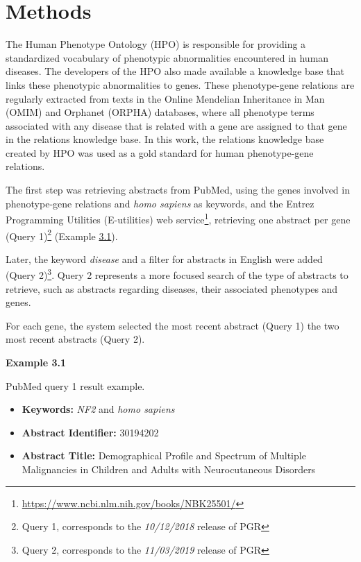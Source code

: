 
\section{Methods}

The Human Phenotype Ontology (HPO) \citep{HPO} is responsible for providing a standardized vocabulary of phenotypic abnormalities encountered in human diseases. The developers of the HPO also made available a knowledge base that links these phenotypic abnormalities to genes. These phenotype-gene relations are regularly extracted from texts in the Online Mendelian Inheritance in Man (OMIM) and  Orphanet (ORPHA) databases, where all phenotype terms associated with any disease that is related with a gene are assigned to that gene in the relations knowledge base. In this work, the relations knowledge base created by HPO was used as a gold standard for human phenotype-gene relations.

The first step was retrieving abstracts from PubMed, using the genes involved in phenotype-gene relations and \textit{homo sapiens} as keywords, and the Entrez Programming Utilities (E-utilities) web service\footnote{\url{https://www.ncbi.nlm.nih.gov/books/NBK25501/}}, retrieving one abstract per gene (Query 1)\footnote{Query 1, corresponds to the \textit{10/12/2018} release of PGR} (Example \hyperlink{ex3.1}{3.1}). 

Later, the keyword \textit{disease} and a filter for abstracts in English were added (Query 2)\footnote{Query 2, corresponds to the \textit{11/03/2019} release of PGR}.  Query 2 represents a more focused search of the type of abstracts to retrieve, such as abstracts regarding diseases, their associated phenotypes and genes.

For each gene, the system selected the most recent abstract (Query 1) the two most recent abstracts (Query 2).

\bigskip


\hypertarget{ex3.1}{\textbf{Example 3.1}} PubMed query 1 result example.

\begin{itemize}

\item\textbf{Keywords:} \textit{NF2} and \textit{homo sapiens}
\item\textbf{Abstract Identifier:} 30194202
\item\textbf{Abstract Title:} Demographical Profile and Spectrum of Multiple Malignancies in Children and Adults with Neurocutaneous Disorders

\end{itemize}

